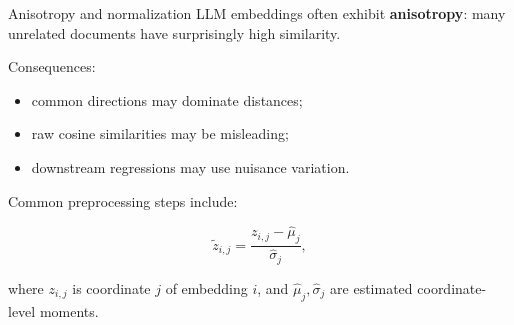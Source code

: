 \documentclass[aspectratio=169]{beamer}
\begin{document}
\begin{frame}{Anisotropy and normalization}
\large
LLM embeddings often exhibit \textbf{anisotropy}: many unrelated documents have surprisingly high similarity.

\vspace{0.2cm}

Consequences:
\begin{itemize}
  \item common directions may dominate distances;
  \item raw cosine similarities may be misleading;
  \item downstream regressions may use nuisance variation.
\end{itemize}

\vspace{0.25cm}

Common preprocessing steps include:

\[
\widetilde{z}_{i,j} = \frac{z_{i,j}-\widehat{\mu}_{j}}{\widehat{\sigma}_{j}},
\]

where \(z_{i,j}\) is coordinate \(j\) of embedding \(i\), and \(\widehat{\mu}_{j},\widehat{\sigma}_{j}\) are estimated coordinate-level moments.
\end{frame}
\end{document}
